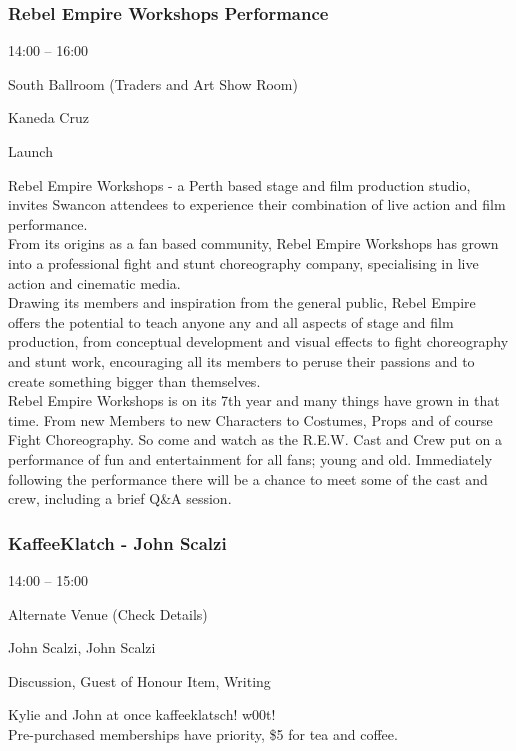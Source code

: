 \documentclass{scrreprt}
\begin{document}
\begin{multicols}{2}
\subsubsection*{Rebel Empire Workshops Performance}\begin{description}
\setlength{\itemsep}{0pt}
\setlength{\parsep}{0pt}
\setlength{\parskip}{0pt}
\item[Time:]{14:00 -- 16:00}
\item[Venue:]{South Ballroom (Traders and Art Show Room)}
\item[People:]{Kaneda Cruz}
\item[Tags:]{Launch}\end{description}
Rebel Empire Workshops - a Perth based stage and film production studio, invites Swancon attendees to experience their combination of live action and film performance.\\From its origins as a fan based community, Rebel Empire Workshops has grown into a professional fight and stunt choreography company, specialising in live action and cinematic media. \\Drawing its members and inspiration from the general public, Rebel Empire offers the potential to teach anyone any and all aspects of stage and film production, from conceptual development and visual effects to fight choreography and stunt work, encouraging all its members to peruse their passions and to create something bigger than themselves.\\Rebel Empire Workshops is on its 7th year and many things have grown in that time. From new Members to new Characters to Costumes, Props and of course Fight Choreography. So come and watch as the R.E.W. Cast and Crew put on a performance of fun and entertainment for all fans; young and old. Immediately following the performance there will be a chance to meet some of the cast and crew, including a brief Q\&A session.
\subsubsection*{KaffeeKlatch - John Scalzi}\begin{description}
\setlength{\itemsep}{0pt}
\setlength{\parsep}{0pt}
\setlength{\parskip}{0pt}
\item[Time:]{14:00 -- 15:00}
\item[Venue:]{Alternate Venue (Check Details)}
\item[People:]{John Scalzi, John Scalzi}
\item[Tags:]{Discussion, Guest of Honour Item, Writing}\end{description}
Kylie and John at once kaffeeklatsch! w00t!\\Pre-purchased memberships have priority, \$5 for tea and coffee.

\end{multicols}
\end{document}
